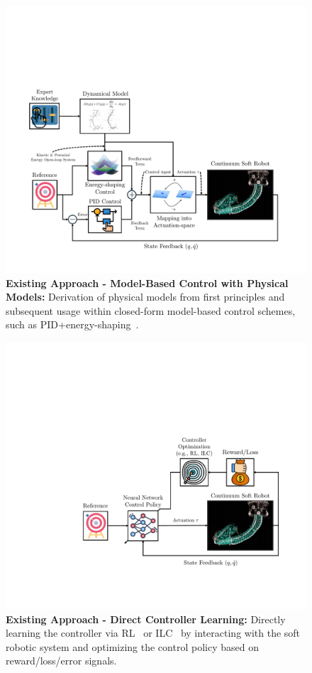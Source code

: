 \begin{figure}[ht]
    \centering
    \includegraphics[width=1.0\linewidth]{introduction/figures/model_based_control_with_physical_models_v1_cropped.pdf}
    \caption{\textbf{Existing Approach - Model-Based Control with Physical Models:} Derivation of physical models from first principles and subsequent usage within closed-form model-based control schemes, such as PID+energy-shaping~\cite{della2023model}.}
    \label{fig:introduction:model_based_control_with_physical_models}
\end{figure}

\begin{figure}[ht]
    \centering
    \includegraphics[width=0.75\linewidth]{introduction/figures/controller_learning_v1_cropped.pdf}
    \caption{\textbf{Existing Approach - Direct Controller Learning:} Directly learning the controller via \gls{RL}~\citep{morimoto2021model, jitosho2023reinforcement, alessi2024pushing} or \gls{ILC}~\citep{hofer2019iterative, pierallini2023provably} by interacting with the soft robotic system and optimizing the control policy based on reward/loss/error signals.}
    \label{fig:introduction:controller_learning}
\end{figure}

